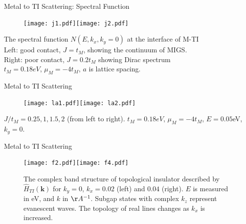 \documentclass[]{beamer}
\def\v#1{\mathbf{#1}}
\begin{document}
\begin{frame}{Metal to TI Scattering: Spectral Function}

\begin{figure}
\center
\texttt{[image: j1.pdf]}\texttt{[image: j2.pdf]}
\end{figure}
The spectral function $N(E,k_x,k_y=0)$ at the interface of M-TI\\
Left:  good contact, $J=t_M$, showing the continuum of MIGS. \\
Right: poor contact, $J=0.2t_M$ showing Dirac spectrum\\
$t_M=0.18eV$, $\mu_M=-4t_M$, $a$ is lattice spacing.
 
\end{frame}




\begin{frame}{Metal to TI Scattering}

\begin{figure}
\center
\texttt{[image: la1.pdf]}\texttt{[image: la2.pdf]}
\end{figure}

$J/t_M=0.25, 1, 1.5, 2$ (from left to right). $t_M=0.18eV$, $\mu_M=-4t_M$, $E=0.05$eV, $k_y=0$.
\end{frame}





\begin{frame}{Metal to TI Scattering}
\begin{figure}
\center
\texttt{[image: f2.pdf]}\texttt{[image: f4.pdf]}
\caption{The complex band structure
of topological insulator described by $\hat{H}_{TI}(\v{k})$ 
for $k_y=0$, $k_x=0.02$ (left) and $0.04$ (right). $E$ is measured in eV, and $k$ in $\AA^{-1}$.
Subgap states with complex $k_z$ represent evanescent waves. 
The topology of  real lines \cite{heine63}  changes as $k_x$ is increased.  
}
\end{figure}
\end{frame}



\end{document}
